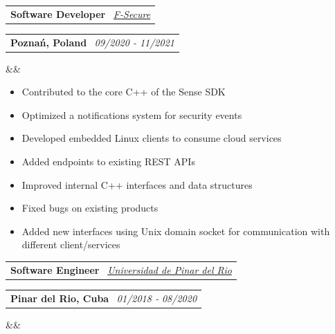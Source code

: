 \documentclass[11pt,a4paper,sans]{moderncv}
\makeatletter
\newcommand*{\customcventry}[7][.13em]{
\begin{tabular}{@{}l}
{\bfseries #4} \
{\itshape #3}
\end{tabular}
\hfill
\begin{tabular}{l@{}}
{\bfseries #5} \
{\itshape #2}
\end{tabular}
\ifx&#7&%
\else{\
\begin{minipage}{\maincolumnwidth}%
\small#7%
\end{minipage}}\fi%
\par\addvspace{#1}}
\makeatother
\begin{document}
\customcventry{09/2020 ‐ 11/2021}
{{\color{blue}\href{https://www.f-secure.com/}{F-Secure}}}
{Software Developer}
{Poznań, Poland}
{}
{}

\begin{itemize}[leftmargin=0.6cm, label={\textbullet}]
    \item Contributed to the core C++ of the Sense SDK
    \item Optimized a notifications system for security events
    \item Developed embedded Linux clients to consume cloud services
    \item Added endpoints to existing REST APIs
    \item Improved internal C++ interfaces and data structures
    \item Fixed bugs on existing products
    \item Added new interfaces using Unix domain socket for communication with different client/services
\end{itemize}


\customcventry{01/2018 ‐ 08/2020}{\color{blue}\href{https://www.upr.edu.cu/}
{Universidad de Pinar del Rio}}
{Software Engineer}
{Pinar del Rio, Cuba}
{}
{}
\end{document}
